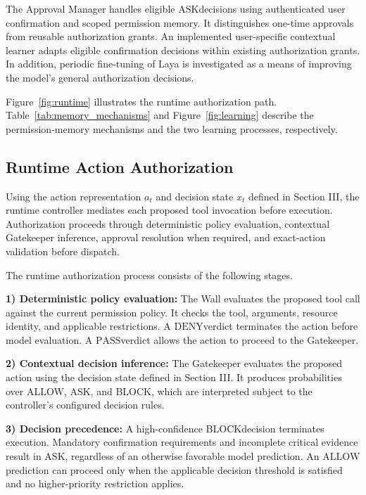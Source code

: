 \documentclass[10pt,conference]{IEEEtran}
\newcommand{\Allow}{\ensuremath{\mathrm{ALLOW}}}
\newcommand{\Ask}{\ensuremath{\mathrm{ASK}}}
\newcommand{\Block}{\ensuremath{\mathrm{BLOCK}}}
\newcommand{\Pass}{\ensuremath{\mathrm{PASS}}}
\newcommand{\Deny}{\ensuremath{\mathrm{DENY}}}
\begin{document}
The Approval Manager handles eligible \Ask decisions using authenticated user confirmation and scoped permission memory. It distinguishes one-time approvals from reusable authorization grants. An implemented user-specific contextual learner adapts eligible confirmation decisions within existing authorization grants. In addition, periodic fine-tuning of Laya is investigated as a means of improving the model's general authorization decisions.

Figure~\ref{fig:runtime} illustrates the runtime authorization path. Table~\ref{tab:memory_mechanisms} and Figure~\ref{fig:learning} describe the permission-memory mechanisms and the two learning processes, respectively.


\subsection{Runtime Action Authorization}


Using the action representation $a_t$ and
decision state $x_t$ defined in Section III,
the runtime controller mediates each proposed
tool invocation before execution. Authorization
proceeds through deterministic policy
evaluation, contextual Gatekeeper inference,
approval resolution when required, and
exact-action validation before dispatch.

The runtime authorization process consists of the following stages.

\textbf{1) Deterministic policy evaluation:}
The Wall evaluates the proposed tool call against the current permission policy. It checks the tool, arguments, resource identity, and applicable restrictions. A \Deny verdict terminates the action before model evaluation. A \Pass verdict allows the action to proceed to the Gatekeeper.

\textbf{2) Contextual decision inference:}
The Gatekeeper evaluates the proposed action
using the decision state defined in Section III.
It produces probabilities over ALLOW, ASK,
and BLOCK, which are interpreted subject to
the controller's configured decision rules.

\textbf{3) Decision precedence:}
A high-confidence \Block decision terminates execution. Mandatory confirmation requirements and incomplete critical evidence result in \Ask, regardless of an otherwise favorable model prediction. An \Allow prediction can proceed only when the applicable decision threshold is satisfied and no higher-priority restriction applies.
\end{document}

